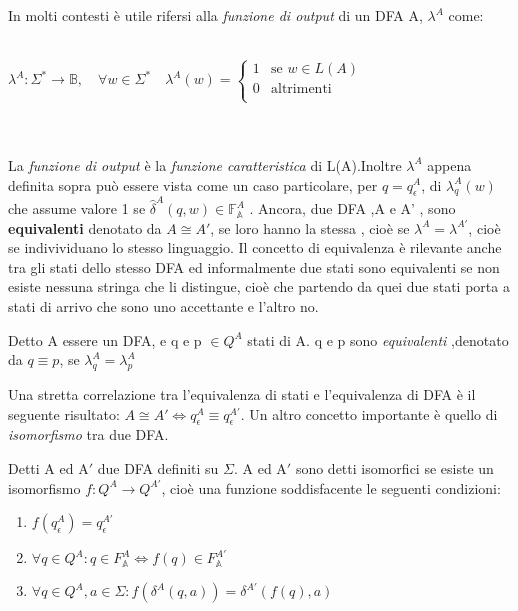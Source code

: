 In molti contesti è utile rifersi alla \textit{funzione di output}  di un \ac{DFA} A, $\lambda^{A}$ come:\\\\
\centerline{$
\lambda^{A} : \Sigma^{*} \to \mathbb{B}, \quad \forall w \in \Sigma^{*}\quad\lambda^{A}(w) = \begin{cases}
1
& \text{se $w \in L(A)$} \\
0 & \text{altrimenti}\\
\end{cases}
$}\\\\
La \textit{funzione di output} è la \textit{funzione caratteristica} di L(A).Inoltre $\lambda^{A}$ appena definita sopra può essere vista come un caso particolare, per $q=q_\epsilon^{A}$, di $\lambda_{q}^{A}(w)$ che assume valore  1 se $ \hat{\delta}^A(q,w) \in \mathbb{F}_{\mathbb{A}}^{A}$ . Ancora, due \ac{DFA} ,A e A' , sono \textbf{equivalenti} denotato da $A \cong A'$, se loro hanno la stessa , cioè se $\lambda^{A} = \lambda^{A'}$, cioè se indivividuano lo stesso linguaggio. Il concetto di equivalenza è rilevante anche tra gli stati dello stesso \ac{DFA} ed informalmente due stati sono equivalenti se non esiste nessuna stringa che li distingue, cioè che partendo da quei due stati porta a stati di arrivo che sono uno accettante e l'altro no.
\begin{definizione*}
Detto A essere un \ac{DFA}, e q e p $\in Q^{A}$ stati di A. q e p sono \textit{equivalenti} ,denotato da $q \equiv p$, se $\lambda_{q}^{A} = \lambda_{p}^{A}$
\end{definizione*}
Una stretta correlazione tra l'equivalenza di stati e l'equivalenza di \ac{DFA} è il seguente risultato: $A \cong A' \Leftrightarrow q_{\epsilon}^{A} \equiv q_{\epsilon}^{A'}$.
Un altro concetto importante è quello di \textit{isomorfismo} tra due DFA.
\begin{definizione*}
Detti A ed $\text{A}'$ due \ac{DFA} definiti su $\Sigma$. A ed $\text{A}'$ sono detti isomorfici se esiste un isomorfismo $f : Q^{A} \to Q^{A'}$, cioè una funzione soddisfacente le seguenti condizioni:
\begin{enumerate}
\item $f(q_{\epsilon}^{A}) = q_{\epsilon}^{A'}$
\item $\forall q \in Q^{A} : q \in F_{\mathbb{A}}^{A} \Leftrightarrow f(q) \in F_{\mathbb{A}}^{A'}$
\item $\forall q \in Q^{A}, a \in \Sigma : f(\delta^{A}(q,a)) = \delta^{A'}(f(q),a)$
\end{enumerate} 
\end{definizione*}
